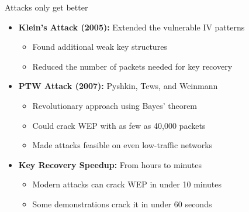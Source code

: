 \documentclass[aspectratio=169, lualatex, handout]{beamer}
\begin{document}
\begin{frame}{Attacks only get better}
	\begin{itemize}[<+->]
		\item \textbf{Klein's Attack (2005):} Extended the vulnerable IV patterns
		      \begin{itemize}[<+->]
			      \item Found additional weak key structures
			      \item Reduced the number of packets needed for key recovery
		      \end{itemize}
		\item \textbf{PTW Attack (2007):} Pyshkin, Tews, and Weinmann
		      \begin{itemize}[<+->]
			      \item Revolutionary approach using Bayes' theorem
			      \item Could crack WEP with as few as 40,000 packets
			      \item Made attacks feasible on even low-traffic networks
		      \end{itemize}
		\item \textbf{Key Recovery Speedup:} From hours to minutes
		      \begin{itemize}[<+->]
			      \item Modern attacks can crack WEP in under 10 minutes
			      \item Some demonstrations crack it in under 60 seconds
		      \end{itemize}
	\end{itemize}
\end{frame}
\end{document}

